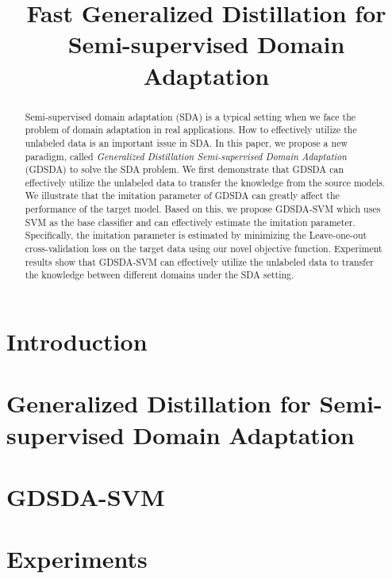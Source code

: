 \documentclass{llncs}
\begin{document}
\title{Fast Generalized Distillation for Semi-supervised Domain Adaptation}
\maketitle
\begin{abstract}
	Semi-supervised domain adaptation (SDA) is a typical setting when we face the problem of domain adaptation in real applications. How to effectively utilize the unlabeled data is an important issue in SDA. In this paper, we propose a new paradigm, called \textit{Generalized Distillation Semi-supervised Domain Adaptation} (GDSDA) to solve the SDA problem.
	We first demonstrate that GDSDA can effectively utilize the unlabeled data to transfer the knowledge from the source models. We illustrate that the imitation parameter of GDSDA can greatly affect the performance of the target model. Based on this, we propose GDSDA-SVM which uses SVM as the base classifier and can effectively estimate the imitation parameter. Specifically, the imitation parameter is estimated by minimizing the Leave-one-out cross-validation loss on the target data using our novel objective function. Experiment results show that GDSDA-SVM can effectively utilize the unlabeled data to transfer the knowledge between different domains under the SDA setting.
\end{abstract}

\section{Introduction}



%

\section{Generalized Distillation for Semi-supervised Domain Adaptation}\label{sec:gdda}



\section{GDSDA-SVM}\label{sec:svm}


\section{Experiments}\label{sec:exp}

\end{document}
